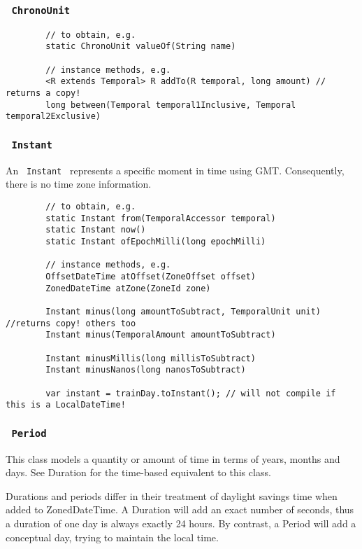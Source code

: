 \documentclass{scrartcl}
\begin{document}
\subsubsection{\lstinline$ ChronoUnit $}

    \begin{lstlisting}
        // to obtain, e.g.
        static ChronoUnit valueOf(String name)

        // instance methods, e.g.
        <R extends Temporal> R addTo(R temporal, long amount) // returns a copy!
        long between(Temporal temporal1Inclusive, Temporal temporal2Exclusive)
\end{lstlisting}

\subsubsection{\lstinline$ Instant $}

     An \lstinline$ Instant $ represents a specific moment in time using GMT.
    Consequently, there is no time zone information.

    \begin{lstlisting}
        // to obtain, e.g.
        static Instant from(TemporalAccessor temporal)
        static Instant now()
        static Instant ofEpochMilli(long epochMilli)

        // instance methods, e.g.
        OffsetDateTime atOffset(ZoneOffset offset)
        ZonedDateTime atZone(ZoneId zone)

        Instant minus(long amountToSubtract, TemporalUnit unit) //returns copy! others too
        Instant minus(TemporalAmount amountToSubtract)

        Instant minusMillis(long millisToSubtract)
        Instant minusNanos(long nanosToSubtract)

        var instant = trainDay.toInstant(); // will not compile if this is a LocalDateTime!

    \end{lstlisting}

\subsubsection{\lstinline$ Period $}

    This class models a quantity or amount of time in terms of years, months and days. See Duration for the time-based equivalent to this class.

    Durations and periods differ in their treatment of daylight savings time when added to ZonedDateTime. A Duration will add an exact number of seconds, thus a duration of one day is always exactly 24 hours. By contrast, a Period will add a conceptual day, trying to maintain the local time.
\end{document}
